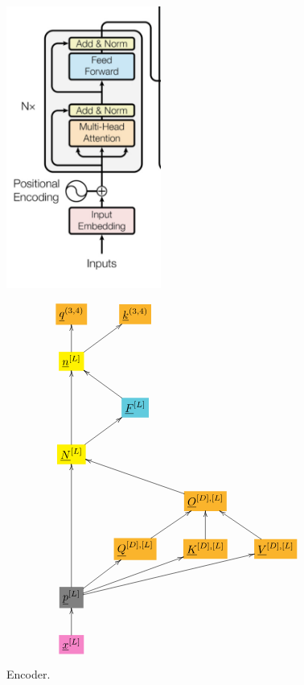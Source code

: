 \documentclass[12pt]{article}
\begin{document}
\begin{figure}[h!]\centering
\begin{minipage}{.5\linewidth}
\includegraphics[width=2in]{encoder.jpg}
\end{minipage}%
\begin{minipage}{.5\linewidth}
$$\xymatrix{
*+[F*:Dandelion]{\underline{q}^{(3, 4)}}&*+[F*:Dandelion]{\underline{k}^{(3, 4)}}&&
\\
*+[F*:yellow]{\underline{n}^{[L]}}\ar[u]\ar[ur]&&&
\\
&*+[F*:SkyBlue]{\underline{F}^{[L]}}\ar[ul]&&
\\
*+[F*:yellow]{\underline{N}^{[L]}}\ar[uu]\ar[ur]&&&
\\
&&*+[F*:Dandelion]{\underline{O}^{[D], [L]}}\ar[ull]&
\\
&*+[F*:Dandelion]{\underline{Q}^{[D], [L]}}\ar[ur]&*+[F*:Dandelion]{\underline{K}^{[D], [L]}}\ar[u]&*+[F*:Dandelion]{\underline{V}^{[D],[L]}}\ar[ul]
\\
*+[F*:gray]{\underline{p}^{[L]}}\ar[uuu]\ar[ur]\ar[urr]\ar[urrr]&&&
\\
*+[F*:Lavender]{\underline{x}^{[L]}}\ar[u]&&&
}$$
\end{minipage}
\caption{Encoder.}
\label{fig-texnn-for-encoder}
\end{figure}
\end{document}
